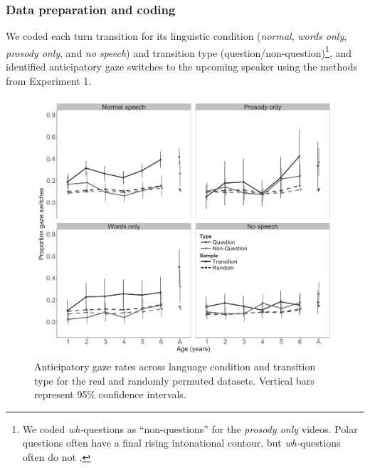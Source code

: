 \documentclass[authoryear, 12pt]{elsarticle}
\begin{document}

\subsubsection*{Data preparation and coding}
We coded each turn transition for its linguistic condition (\textit{normal}, \textit{words only}, \textit{prosody only}, and \textit{no speech}) and transition type (question/non-question)\footnote{We coded \textit{wh-}questions as ``non-questions'' for the \textit{prosody only} videos. Polar questions often have a final rising intonational contour, but \textit{wh-}questions often do not  \citep{hedberg2010}.}, and identified anticipatory gaze switches to the upcoming speaker using the methods from Experiment 1.

\begin{figure}[!ht]
\begin{center}
\includegraphics[width=\textwidth]{figures/E2-samples-by-lang-groups-trans-types.png}
\end{center}
\caption{Anticipatory gaze rates across language condition and transition type for the real and randomly permuted datasets. Vertical bars represent 95\% confidence intervals.} 
\label{fig:E2-randvsreal}
\end{figure}
\end{document}
